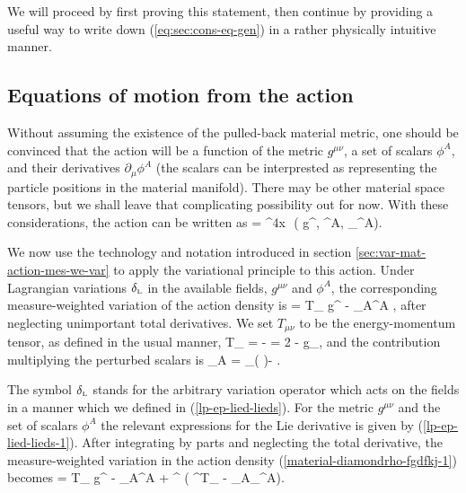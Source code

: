 We will proceed by first proving this statement, then continue by providing a useful way to write down  (\ref{eq:sec:cons-eq-gen}) in a rather physically intuitive manner.

\subsection{Equations of motion from the action}
Without assuming the existence of the pulled-back material metric, one should be convinced that the action will be a function of the metric $g^{\mu\nu}$,  a set of scalars $\phi^A$, and their derivatives $  \partial_{\mu}\phi^A$ (the scalars can be interprested as representing the particle positions in the material manifold). There may  be other material space tensors, but we shall leave that complicating possibility out for now. With these considerations, the action can be written as
\bea
{} = \int \dd^4x\,\, \rho\left( g^{\mu\nu}, \phi^A, \partial_{\mu}\phi^A\right).
\eea

We now use the technology and notation introduced in section \ref{sec:var-mat-action-mes-we-var} to apply the variational principle to this action. Under Lagrangian variations ${ {\delta}_{\scriptscriptstyle{\rm{L}}}}$ in the available fields, $g^{\mu\nu}$ and $\phi^A$, the corresponding  measure-weighted variation of the action density  is
\bea
\label{material-diamondrho-fgdfkj-1}
\Diamond\rho =   T_{\mu\nu} \lp g^{\mu\nu} - _A\lp \phi^A ,
\eea
after neglecting unimportant total derivatives.
We set $T_{\mu\nu}$ to be the energy-momentum tensor, as defined in the usual manner, 
\bea
T_{\mu\nu} = -  = 2 - \rho g_{\mu\nu},
\eea
and the contribution  multiplying the perturbed scalars is
\bea
{}_A = \nabla_{\mu}\left( \right)-  .
\eea

The symbol ${ {\delta}_{\scriptscriptstyle{\rm{L}}}}$     stands for the  arbitrary variation operator which acts on the fields in a manner  which we defined in (\ref{lp-ep-lied-lieds}). For the metric $g^{\mu\nu}$ and the set of scalars $\phi^A$   the relevant expressions for the Lie derivative is given by (\ref{lp-ep-lied-lieds-1}). 
After integrating by parts and neglecting the total derivative, the measure-weighted  variation in the action density (\ref{material-diamondrho-fgdfkj-1}) becomes
\bea
\label{eq:diff-var-SM}
\Diamond\rho = T_{\mu\nu} \ep g^{\mu\nu} - _A\ep \phi^A + \xi^{\mu} \left( \nabla^{\nu}T_{\mu\nu} - _A\nabla_{\mu}\phi^A\right).
\eea

